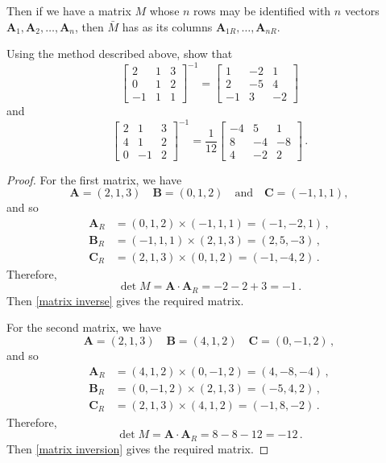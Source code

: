 Then if we have a matrix $M$ whose $n$ rows may be identified with $n$ vectors $\bm{A}_1, \bm{A}_2, \dots, \bm{A}_n$, then $\bar{M}$ has as its columns $\bm{A}_{1R}, \dots, \bm{A}_{nR}$.

\begin{exercise}
Using the method described above, show that
\begin{equation*}
    \begin{bmatrix}
    2 & 1 & 3 \\
    0 & 1 & 2 \\
    -1 & 1 & 1
    \end{bmatrix}^{-1}
    =
    \begin{bmatrix}
    1 & -2 & 1 \\
    2 & -5 & 4 \\
    -1 & 3 & -2
    \end{bmatrix}
\end{equation*}
and
\begin{equation*}
    \begin{bmatrix}
    2 & 1 & 3 \\
    4 & 1 & 2 \\
    0 & -1 & 2
    \end{bmatrix}^{-1}
    = \frac{1}{12}
    \begin{bmatrix}
    -4 & 5 & 1 \\
    8 & -4 & -8 \\
    4 & -2 & 2
    \end{bmatrix}\,.
\end{equation*}
\end{exercise}

\begin{proof}
For the first matrix, we have $$\bm{A} = (2, 1, 3) \quad \bm{B} = (0, 1, 2) \quad \text{and} \quad \bm{C} = (-1, 1, 1),$$ and so
\begin{align}
    \bm{A}_R &= (0, 1, 2) \times (-1, 1, 1) = (-1, -2, 1)\,, \\
    \bm{B}_R &= (-1, 1, 1) \times (2, 1, 3) = (2, 5, -3)\,, \\
    \bm{C}_R &= (2, 1, 3) \times (0, 1, 2) = (-1, -4, 2)\,.
\end{align}
Therefore,
\[ \det M = \bm{A} \cdot \bm{A}_R = -2 - 2 + 3 = -1\,. \]
Then \eqref{matrix inverse} gives the required matrix.

For the second matrix, we have
\[ \bm{A} = (2, 1, 3) \quad \bm{B} = (4, 1, 2) \quad \bm{C} = (0, -1, 2)\,, \]
and so
\begin{align}
    \bm{A}_R &= (4, 1, 2) \times (0, -1, 2) = (4, -8, -4)\,, \\
    \bm{B}_R &= (0, -1, 2) \times (2, 1, 3) = (-5, 4, 2)\,, \\
    \bm{C}_R &= (2, 1, 3) \times (4, 1, 2) = (-1, 8, -2)\,.
\end{align}
Therefore,
\[ \det M = \bm{A} \cdot \bm{A}_R = 8 - 8 - 12 = -12\,. \]
Then \eqref{matrix inversion} gives the required matrix.
\end{proof}

